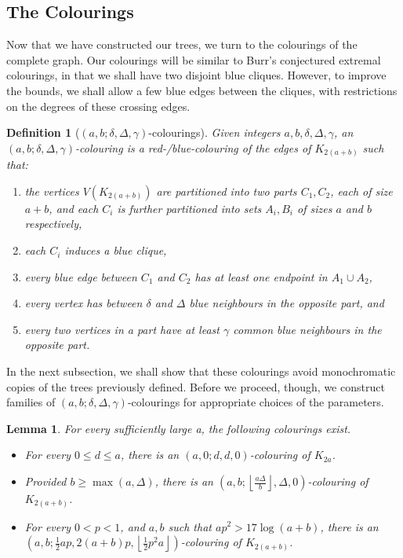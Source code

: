 \documentclass[11pt]{article}
\newtheorem{lemma}[theorem]{Lemma}
\newtheorem{dfn}[theorem]{Definition}
\begin{document}
\subsection{The Colourings}

Now that we have constructed our trees, we turn to the colourings of the complete graph. Our colourings will be similar to Burr's conjectured extremal colourings, in that we shall have two disjoint blue cliques. However, to improve the bounds, we shall allow a few blue edges between the cliques, with restrictions on the degrees of these crossing edges.

\begin{dfn}[$(a,b;\delta, \Delta, \gamma)$-colourings] \label{dfn:colourings}
Given integers $a, b, \delta, \Delta, \gamma$, an \emph{$(a,b;\delta, \Delta, \gamma)$-colouring} is a red-/blue-colouring of the edges of $K_{2(a+b)}$ such that:
\begin{enumerate}
    \item the vertices $V(K_{2(a+b)})$ are partitioned into two \emph{parts} $C_1, C_2$, each of size $a + b$, and each $C_i$ is further partitioned into sets $A_i, B_i$ of sizes $a$ and $b$ respectively,
    \item each $C_i$ induces a blue clique,
    \item every blue edge between $C_1$ and $C_2$ has at least one endpoint in $A_1 \cup A_2$,
    \item every vertex has between $\delta$ and $\Delta$ blue neighbours in the opposite part, and
    \item every two vertices in a part have at least $\gamma$ common blue neighbours in the opposite part.
\end{enumerate}
\end{dfn}

In the next subsection, we shall show that these colourings avoid monochromatic copies of the trees previously defined. Before we proceed, though, we construct families of $(a,b;\delta, \Delta, \gamma)$-colourings for appropriate choices of the parameters.

\begin{lemma} \label{lem:existence-of-colourings}
    For every sufficiently large a, the following colourings exist.
    \begin{itemize}
        \item[(a)] For every $0 \le d \le a$, there is an $(a,0;d,d,0)$-colouring of $K_{2a}$.
        \item[(b)] Provided $b \ge \max( a, \Delta)$, there is an $(a, b; \left \lfloor \frac{a \Delta}{b} \right \rfloor, \Delta, 0)$-colouring of $K_{2(a+b)}$.
        \item[(c)] For every $0 < p < 1$, and $a,b$ such that $ap^2 > 17 \log (a+b)$, there is an $(a, b; \frac12 ap, 2(a+b)p, \left \lfloor \frac12 p^2 a \right \rfloor )$-colouring of $K_{2(a+b)}$.
    \end{itemize}
\end{lemma}
\end{document}
